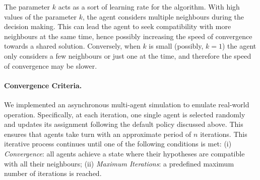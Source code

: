 The parameter $k$ acts as a sort of learning rate for the algorithm.
With high values of the parameter $k$, the agent considers multiple neighbours during the decision making. This can lead the agent to seek compatibility with more neighbours at the same time, hence possibly increasing the speed of convergence towards a shared solution. Conversely, when $k$ is small (possibly, $k=1$) the agent only considers a few neighbours or just one at the time, and therefore the speed of convergence may be slower.

\paragraph{Convergence Criteria.} 
We implemented an asynchronous multi-agent simulation to emulate real-world operation. Specifically, at each iteration, one single agent is selected randomly and updates its assignment following the default policy discussed above. This ensures that agents take turn with an approximate period of $n$ iterations.
This iterative process continues until one of the following conditions is met: (i) \emph{Convergence}: all agents achieve a state where their hypotheses are compatible with all their neighbours; (ii) \emph{Maximum Iterations}: a predefined maximum number of iterations is reached.


